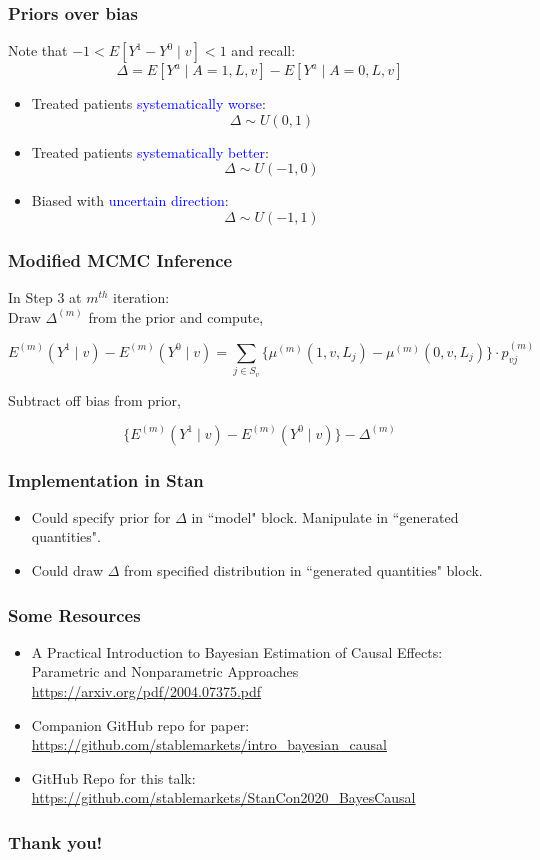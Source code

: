 \documentclass[xcolor=x11names,compress]{beamer}
\renewcommand{\(}{\begin{columns}}
\renewcommand{\)}{\end{columns}}
\newcommand{\<}[1]{\begin{column}{#1}}
\renewcommand{\>}{\end{column}}
\begin{document}
\begin{frame}
	\frametitle{Priors over bias}
	Note that $-1 < E[Y^1 - Y^0 \mid v ] < 1$ and recall:
	$$\Delta  = E[Y^a \mid A=1, L, v] - E[Y^a \mid A=0, L, v] $$
	
	\begin{itemize}
		\pause
		\item Treated patients \textcolor{blue}{systematically worse}:
		$$ \Delta \sim U(0, 1) $$
		
		\pause
		\item Treated patients \textcolor{blue}{systematically better}:
		$$ \Delta \sim U(-1, 0) $$
		
		\pause
		\item Biased with \textcolor{blue}{uncertain direction}:
		$$ \Delta \sim U(-1,1) $$		
	\end{itemize}
\end{frame}

\begin{frame}
	\frametitle{Modified MCMC Inference}

	In Step 3 at $m^{th}$ iteration: \\

	Draw $\Delta^{(m)}$ from the prior and compute, 
	
	$$ E^{(m)}(Y^1 \mid v ) -  E^{(m)}(Y^0 \mid v )  =  \sum_{j \in S_v } \Big\{ \mu^{(m)}( 1, v, L_j )  - \mu^{(m)}( 0, v, L_j ) \Big\}  \cdot p_{vj}^{(m)} $$
	
	Subtract off bias from prior, 
	
	$$ \Big \{E^{(m)}(Y^1 \mid v ) -  E^{(m)}(Y^0 \mid v ) \Big\}  - \Delta^{(m)} $$
	
	

\end{frame}

\begin{frame}
	\frametitle{Implementation in Stan}

	\begin{itemize}
		\item Could specify prior for $\Delta$ in ``model" block. Manipulate in ``generated quantities".
		\item Could draw $\Delta$ from specified distribution in ``generated quantities" block.
	\end{itemize}
\end{frame}

\begin{frame}
	\frametitle{Some Resources}

	\begin{itemize}
		\item A Practical Introduction to Bayesian Estimation of Causal Effects: Parametric and Nonparametric Approaches
		\url{https://arxiv.org/pdf/2004.07375.pdf}
		\item Companion GitHub repo for paper:
		\url{https://github.com/stablemarkets/intro_bayesian_causal}
		\item GitHub Repo for this talk:
		\url{https://github.com/stablemarkets/StanCon2020_BayesCausal}
	\end{itemize}
\end{frame}

\begin{frame}
	\frametitle{Thank you!}

\end{frame}
\end{document}
